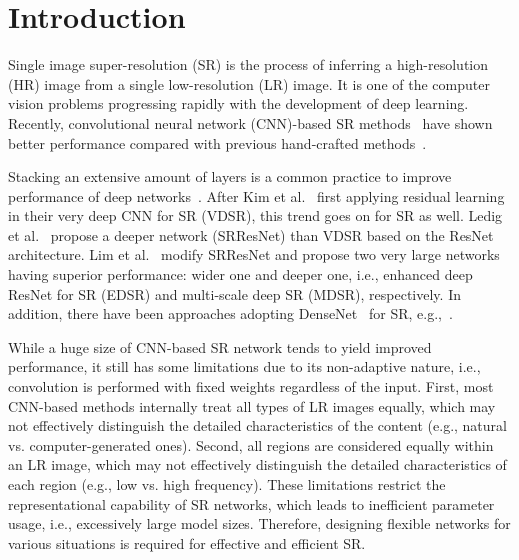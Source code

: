 \documentclass[final,5p,times,twocolumn]{elsarticle}
\begin{document}
\section{Introduction}
\label{section:intro}
Single image super-resolution (SR) is the process of inferring a high-resolution (HR) image from a single low-resolution (LR) image.
It is one of the computer vision problems progressing rapidly with the development of deep learning.
Recently, convolutional neural network (CNN)-based SR methods~\cite{dong2014learning, kim2016accurate,ledig2016photo, lim2017enhanced, tong2017image, haris2018deep, zhang2018residual, li2018multi, zhang2018rcan} have shown better performance compared with previous hand-crafted methods~\cite{chang2004neighbor, sun2008gradient, yang2010image, timofte2013anchored, huang2015single}.

Stacking an extensive amount of layers is a common practice to improve performance of deep networks~\cite{montufar2014number}.
After Kim et al.~\cite{kim2016accurate} first applying residual learning in their very deep CNN for SR (VDSR), this trend goes on for SR as well.
Ledig et al.~\cite{ledig2016photo} propose a deeper network (SRResNet) than VDSR based on the ResNet architecture.
Lim et al.~\cite{lim2017enhanced} modify SRResNet and propose two very large networks having superior performance: wider one and deeper one, i.e., enhanced deep ResNet for SR (EDSR) and multi-scale deep SR (MDSR), respectively.
In addition, there have been approaches adopting DenseNet~\cite{huang2017densely} for SR, e.g.,~\cite{tong2017image,zhang2018residual}.

While a huge size of CNN-based SR network tends to yield improved performance, it still has some limitations due to its non-adaptive nature, i.e., convolution
is performed with fixed weights regardless of the input.
First, most CNN-based methods internally treat all types of LR images equally, which may not effectively distinguish the detailed characteristics of the content (e.g., natural vs. computer-generated ones).
Second, all regions are considered equally within an LR image, which may not effectively distinguish the detailed characteristics of each region (e.g., low vs. high frequency).
These limitations restrict the representational capability of SR networks, which leads to inefficient parameter usage, i.e., excessively large model sizes.
Therefore, designing flexible networks for various situations is required for effective and efficient SR.
\end{document}
